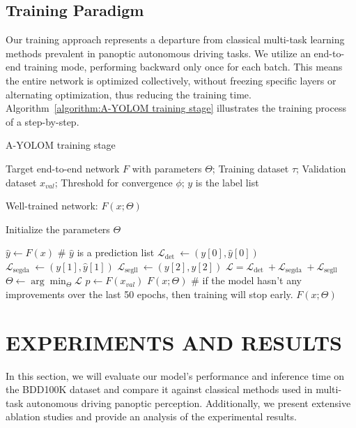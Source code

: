\documentclass[lettersize,journal]{IEEEtran}
\newcommand{\INPUT}{\item[\textbf{Input:}]}
\newcommand{\OUTPUT}{\item[\textbf{Output:}]}
\begin{document}
\subsection{Training Paradigm}
\label{subsec: Training Paradigm}
Our training approach represents a departure from classical multi-task learning methods prevalent in panoptic autonomous driving tasks. We utilize an end-to-end training mode, performing backward only once for each batch. This means the entire network is optimized collectively, without freezing specific layers or alternating optimization, thus reducing the training time. Algorithm~\ref{algorithm:A-YOLOM training stage} illustrates the training process of a step-by-step.

\begin{algorithm}[h]
\caption{A-YOLOM training stage}
\label{algorithm:A-YOLOM training stage}
\begin{algorithmic}[1]
\INPUT Target end-to-end network $F$ with parameters $\Theta$;
Training dataset $\tau$;
Validation dataset $x_{val}$;
Threshold for convergence $\phi$;
$y$ is the label list
\OUTPUT Well-trained network: $F(x; \Theta)$

\STATE Initialize the parameters $\Theta$

        \STATE \(\hat{y} \leftarrow F(x)\)  \# $\hat{y}$ is a prediction list
        \STATE \(\mathcal{L}_{\text {det }} \leftarrow (y[0],\hat{y}[0])\)
        \STATE \(\mathcal{L}_{\text {segda }} \leftarrow (y[1],\hat{y}[1])\)
        \STATE \(\mathcal{L}_{\text {segll }} \leftarrow (y[2],\hat{y}[2])\)
        \STATE \(\mathcal{L}=\mathcal{L}_{\text {det }}+\mathcal{L}_{\text {segda }}+\mathcal{L}_{\text {segll }}\)
        \STATE \(\Theta \leftarrow \arg \min _{\Theta} \mathcal{L}\)
    \ENDFOR
    \STATE \(p \leftarrow F(x_{val})\) 
        \RETURN \( F(x; \Theta) \) \# if the model hasn't any improvements over the last 50 epochs, then training will stop early.
    \ENDIF
\ENDFOR
\RETURN \( F(x; \Theta) \)
\end{algorithmic}
\end{algorithm}


\section{EXPERIMENTS AND RESULTS}
\label{sec: EXPERIMENTS AND RESULTS}

In this section, we will evaluate our model's performance and inference time on the BDD100K dataset and compare it against classical methods used in multi-task autonomous driving panoptic perception. Additionally, we present extensive ablation studies and provide an analysis of the experimental results.
\end{document}

